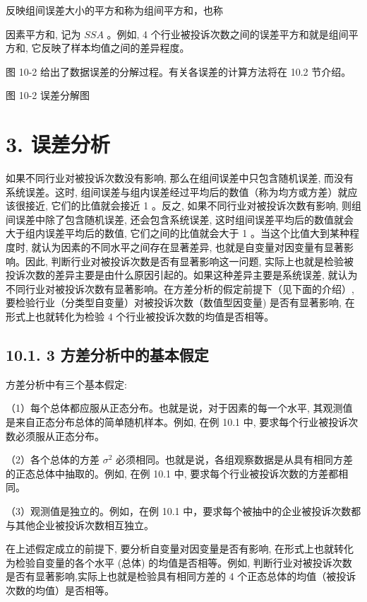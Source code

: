 \documentclass[10pt]{article}
\begin{document}
\begin{CJK*}{UTF8}{bsmi}
反映组间误差大小的平方和称为组间平方和，也称

因素平方和, 记为 $S S A$ 。例如, 4 个行业被投诉次数之间的误差平方和就是组间平方和, 它反映了样本均值之间的差异程度。

图 10-2 给出了数据误差的分解过程。有关各误差的计算方法将在 10.2 节介绍。

\begin{center}
\end{center}

图 10-2 误差分解图

\section*{3. 误差分析}
如果不同行业对被投诉次数没有影响, 那么在组间误差中只包含随机误差, 而没有系统误差。这时, 组间误差与组内误差经过平均后的数值（称为均方或方差）就应该很接近, 它们的比值就会接近 1 。反之, 如果不同行业对被投诉次数有影响, 则组间误差中除了包含随机误差, 还会包含系统误差, 这时组间误差平均后的数值就会大于组内误差平均后的数值, 它们之间的比值就会大于 1 。当这个比值大到某种程度时, 就认为因素的不同水平之间存在显著差异, 也就是自变量对因变量有显著影响。因此, 判断行业对被投诉次数是否有显著影响这一问题, 实际上也就是检验被投诉次数的差异主要是由什么原因引起的。如果这种差异主要是系统误差, 就认为不同行业对被投诉次数有显著影响。在方差分析的假定前提下（见下面的介绍）, 要检验行业（分类型自变量）对被投诉次数（数值型因变量) 是否有显著影响, 在形式上也就转化为检验 4 个行业被投诉次数的均值是否相等。

\subsection*{10.1. 3 方差分析中的基本假定}
方差分析中有三个基本假定:

（1）每个总体都应服从正态分布。也就是说，对于因素的每一个水平, 其观测值是来自正态分布总体的简单随机样本。例如, 在例 10.1 中, 要求每个行业被投诉次数必须服从正态分布。

（2）各个总体的方差 $\sigma^{2}$ 必须相同。也就是说，各组观察数据是从具有相同方差的正态总体中抽取的。例如, 在例 10.1 中, 要求每个行业被投诉次数的方差都相同。

（3）观测值是独立的。例如，在例 10.1 中，要求每个被抽中的企业被投诉次数都与其他企业被投诉次数相互独立。

在上述假定成立的前提下, 要分析自变量对因变量是否有影响, 在形式上也就转化为检验自变量的各个水平 (总体) 的均值是否相等。例如, 判断行业对被投诉次数是否有显著影响,实际上也就是检验具有相同方差的 4 个正态总体的均值（被投诉次数的均值）是否相等。


\end{CJK*}
\end{document}
